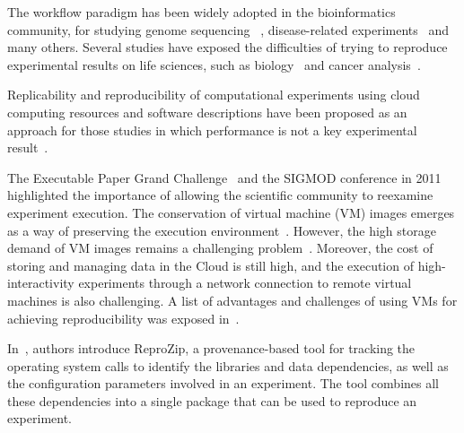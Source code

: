 The workflow paradigm has been widely adopted in the bioinformatics community, for studying genome sequencing ~\cite{blankenberg2010galaxy, giardine2005galaxy}, disease-related experiments~\cite{fisher2009systematic, gaizauskas2004} and many others. Several studies have exposed the difficulties of trying to reproduce experimental results on life sciences, such as biology~\cite{Ioannidis2009} and cancer analysis~\cite{ErringtonCancerRerpoducibility}.

Replicability and reproducibility of computational experiments using cloud computing resources and software descriptions have been proposed as an approach for those studies in which performance is not a key experimental result~\cite{Crick14}.

The Executable Paper Grand Challenge~\cite{elsevierchallenge} and the SIGMOD conference in 2011~\cite{SIGMOD} highlighted the importance of allowing the scientific community to reexamine experiment execution. The conservation of virtual machine (VM) images emerges as a way of preserving the execution environment~\cite{Brammer,SHARE}. However, the high storage demand of VM images remains a challenging problem~\cite{Mao:2014:ROD:2600090.2512348,6552826}. Moreover, the cost of storing and managing data in the Cloud is still high, and the execution of high-interactivity experiments through a network connection to remote virtual machines is also challenging. A list of advantages and challenges of using VMs for achieving reproducibility was exposed in~\cite{Howe2012}.

In~\cite{reprozip}, authors introduce ReproZip, a provenance-based tool for tracking the operating system calls to identify the libraries and data dependencies, as well as the configuration parameters involved in an experiment. The tool combines all these dependencies into a single package that can be used to reproduce an experiment. 


